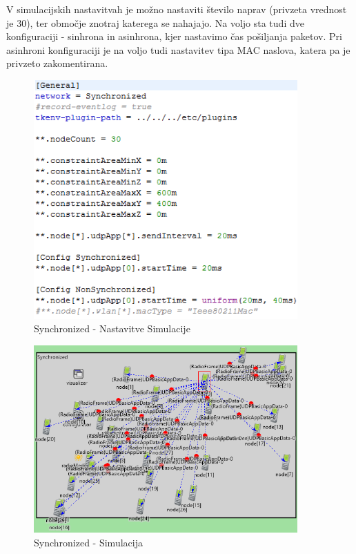 \documentclass[11pt,a4paper,slovene]{myarticle}
\begin{document}
V simulacijskih nastavitvah je možno nastaviti število naprav (privzeta vrednost je 30), ter območje znotraj katerega se nahajajo. Na voljo sta tudi dve konfiguraciji - sinhrona in asinhrona, kjer nastavimo čas pošiljanja paketov. Pri asinhroni konfiguraciji je na voljo tudi nastavitev tipa MAC naslova, katera pa je privzeto zakomentirana.
\begin{figure}[h]
	\centering
		\includegraphics[width=0.9\textwidth, keepaspectratio=true]{./images/syn-settings.png}
	\caption{Synchronized - Nastavitve Simulacije}
	\label{fig:synchronizednastavitvesimulacije}
\end{figure}
\begin{figure}[h]
	\centering
		\includegraphics[width=0.9\textwidth, keepaspectratio=true]{./images/syn-simulation.png}
	\caption{Synchronized - Simulacija}
	\label{fig:synchronizedsimulacija}
\end{figure}
\end{document}
